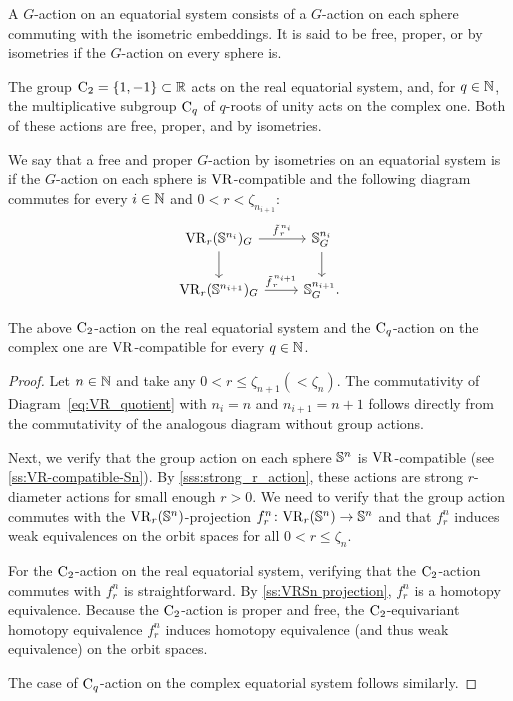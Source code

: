 \subsubsection{}\label{ss:system VR compatible}

A \(G\)-action on an equatorial system consists of a \(G\)-action on each sphere commuting with the isometric embeddings.
It is said to be free, proper, or by isometries if the \(G\)-action on every sphere is.

The group \(\mathrm{C}_2 = \{1,-1\} \subset \mathbb{R}\) acts on the real equatorial system, and, for \(q \in \mathbb{N}\), the multiplicative subgroup \(\mathrm{C}_q\) of \(q\)-roots of unity acts on the complex one.
Both of these actions are free, proper, and by isometries.

We say that a free and proper \(G\)-action by isometries on an equatorial system is  if the \(G\)-action on each sphere is \(\mathrm{VR}\)-compatible and the following diagram commutes for every \(i \in \mathbb{N}\) and $0 < r < \zeta_{n_{i+1}}$:
\begin{equation}\label{eq:VR_quotient}
    \begin{tikzcd}
	\VR_r(\bS^{n_i})_G
	\ar[d]
	\ar[r, "\tilde f_{\,r}^{\,n_i}" above]
	&
	\bS^{n_i}_G
	\ar[d]
	\\
	\VR_r(\bS^{n_{i+1}})_G
	\ar[r, "\tilde f_{\,r}^{\,n_{i+1}}" above]
	&
	\bS^{n_{i+1}}_G.
\end{tikzcd}
\end{equation}

\lemma The above \(\mathrm{C}_2\)-action on the real equatorial system and the \(\mathrm{C}_q\)-action on the complex one are \(\mathrm{VR}\)-compatible for every \(q \in \mathbb{N}\).

\begin{proof}
    Let $n \in \mathbb{N}$ and take any $0 < r \leq \zeta_{n+1} (< \zeta_{n})$.
    The commutativity of Diagram~\ref{eq:VR_quotient} with $n_i = n$ and $n_{i+1} = n+1$ follows directly from the commutativity of the analogous diagram without group actions.

    Next, we verify that the group action on each sphere $\mathbb{S}^n$ is \(\mathrm{VR}\)-compatible (see \cref{ss:VR-compatible-Sn}).
    By \cref{sss:strong_r_action}, these actions are strong \(r\)-diameter actions for small enough $r>0$. 
    We need to verify that the group action commutes with the $\mathrm{VR}_r(\mathbb{S}^{n})$-projection $f_r^{n}\colon \mathrm{VR}_r(\mathbb{S}^{n}) \to \mathbb{S}^{n}$ and that $f_r^{n}$ induces weak equivalences on the orbit spaces for all $0 < r \leq \zeta_{n}$.

    For the $\mathrm{C}_2$-action on the real equatorial system, verifying that the $\mathrm{C}_2$-action commutes with $f_r^{n}$ is straightforward.
    By \cref{ss:VRSn projection}, $f_r^{n}$ is a homotopy equivalence.
    Because the $\mathrm{C}_2$-action is proper and free, the $\mathrm{C}_2$-equivariant homotopy equivalence $f_r^n$ induces homotopy equivalence (and thus weak equivalence) on the orbit spaces.

    The case of $\mathrm{C}_q$-action on the complex equatorial system follows similarly.
\end{proof}

